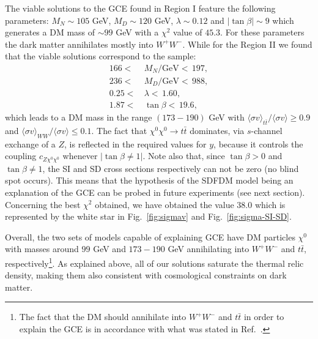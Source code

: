 The viable solutions to the GCE found in Region I feature the following parameters: $M_N\sim 105$ GeV, $M_D\sim 120$ GeV, $\lambda\sim 0.12$ and $|\tan\beta|\sim 9$ which generates a DM mass of $\sim 99$ GeV with a $\chi^2$ value of $45.3$. For these parameters the dark matter annihilates mostly into $W^+W^-$. 
While for the Region II we found that the viable solutions correspond to the sample:
\begin{align}
166  < & \, M_N/\text{GeV} < \, 197 , \nonumber \\
236  < & \, M_D/\text{GeV} < \, 988 , \nonumber \\ 
0.25  < & \, \lambda < \, 1.60 ,\nonumber \\
1.87 <  &\, \tan\beta < \, 19.6,
\end{align}
which leads to a DM mass in the range $(173-190)$ GeV with $\langle\sigma v\rangle_{t\bar{t}}/\langle\sigma v\rangle\geq 0.9$ and $\langle\sigma v\rangle_{WW}/\langle\sigma v\rangle\leq 0.1$. The fact that $\chi^0\chi^0\to t\bar{t}$ dominates, via $s$-channel exchange of a $Z$, is reflected in the required values for $y$, because it controls the coupling $c_{Z\chi^0\chi^0}$ whenever $|\tan\beta\neq1|$. 
Note also that, since $\tan\beta>0$ and $\tan\beta\neq1$, the SI and SD cross sections respectively can not be zero (no blind spot occurs). This means that the hypothesis of the SDFDM model being an explanation of the GCE can be probed in future experiments (see next section). Concerning the best $\chi^2$ obtained, we have obtained the value $38.0$ which is represented by the white star in Fig.~\ref{fig:sigmav} and Fig.~\ref{fig:sigma-SI-SD}. 

Overall, the two sets of models capable of explaining GCE have DM particles $\chi^0$ with masses around $99$ GeV and $173-190$ GeV annihilating into $W^+W^-$ and $t\bar{t}$, respectively\footnote{The fact that the DM should annihilate into $W^+W^-$ and $t\bar{t}$ in order to explain the GCE is in accordance with what was stated in Ref.~\cite{Agrawal:2014oha}.}. As explained above, all of our solutions saturate the thermal relic density, making them also consistent with cosmological constraints on dark matter. 








